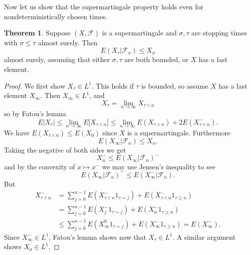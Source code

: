 \documentclass[12pt]{book}
\theoremstyle{definition}
\newtheorem{theorem}{Theorem}[chapter]
\begin{document}
Now let us show that the supermartingale property holds even for nondeterministically chosen times.

\begin{theorem}
Suppose $(X, \mathcal F)$ is a supermartingale and $\sigma,\tau$ are stopping times with $\sigma \leq \tau$ almost surely.
Then
$$E(X_\tau|\mathcal F_\sigma) \leq X_\sigma$$
almost surely, assuming that either $\sigma,\tau$ are both bounded, or $X$ has a last element.
\end{theorem}
\begin{proof}
We first show $X_\tau \in L^1$. This holds if $\tau$ is bounded, so assume $X$ has a last element $X_\infty$.
Then $X_\infty \in L^1$, and
$$X_\tau = \lim_{n \to \infty} X_{\tau \wedge n}$$
so by Fatou's lemma
$$E|X_\tau| \leq \lim_{n \to \infty} E|X_{\tau \wedge n}| \leq \lim_{n \to \infty} E(X_{\tau \wedge n}) + 2E(X_{\tau \wedge n}^-).$$
We have $E(X_{\tau \wedge n}) \leq E(X_0)$ since $X$ is a supermartingale. Furthermore
$$E(X_\infty|\mathcal F_n) \leq X_n.$$
Taking the negative of both sides we get
$$X_n^- \leq E(X_\infty|\mathcal F_n)^-$$
and by the convexity of $x \mapsto x^-$ we may use Jensen's inequality to see
$$E(X_\infty|\mathcal F_n)^- \leq E(X_\infty^-|\mathcal F_n).$$
But
\begin{align*}
X_{\tau \wedge n}^- &= \sum_{j=0}^{n-1} E(X_{\tau \wedge n}^- 1_{\tau = j}) + E(X_{\tau \wedge n}^- 1_{\tau \geq n})\\
&= \sum_{j=0}^{n-1} E(X_j^- 1_{\tau = j}) + E(X_n^- 1_{\tau \geq n})\\
&\leq \sum_{j=0}^{n-1} E(X_\infty^0 1_{\tau = j}) + E(X_\infty^- 1_{\tau \geq n}) = E(X_\infty^-).
\end{align*}
Since $X_\infty^- \in L^1$, Fatou's lemma shows now that $X_\tau \in L^1$.
A similar argument shows $X_\sigma \in L^1$.


\end{proof}
\end{document}
